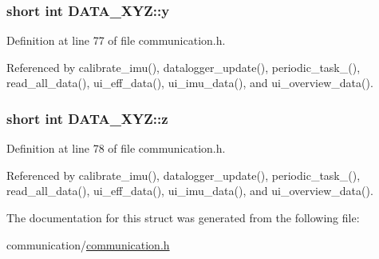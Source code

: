 \hypertarget{structDATA__XYZ_a94bbb1c889bf53eb6a5fffa2b39322cf}{
\subsubsection[{y}]{\setlength{\rightskip}{0pt plus 5cm}short int D\-A\-T\-A\-\_\-\-X\-Y\-Z\-::y}}\label{structDATA__XYZ_a94bbb1c889bf53eb6a5fffa2b39322cf}


Definition at line 77 of file communication.\-h.



Referenced by calibrate\-\_\-imu(), datalogger\-\_\-update(), periodic\-\_\-task\-\_(), read\-\_\-all\-\_\-data(), ui\-\_\-eff\-\_\-data(), ui\-\_\-imu\-\_\-data(), and ui\-\_\-overview\-\_\-data().

\hypertarget{structDATA__XYZ_a69e89ab0ec6e5d72fc5d54f62cc07fb5}{
\subsubsection[{z}]{\setlength{\rightskip}{0pt plus 5cm}short int D\-A\-T\-A\-\_\-\-X\-Y\-Z\-::z}}\label{structDATA__XYZ_a69e89ab0ec6e5d72fc5d54f62cc07fb5}


Definition at line 78 of file communication.\-h.



Referenced by calibrate\-\_\-imu(), datalogger\-\_\-update(), periodic\-\_\-task\-\_(), read\-\_\-all\-\_\-data(), ui\-\_\-eff\-\_\-data(), ui\-\_\-imu\-\_\-data(), and ui\-\_\-overview\-\_\-data().



The documentation for this struct was generated from the following file\-:\begin{DoxyCompactItemize}
\item 
communication/\hyperlink{communication_2communication_8h}{communication.\-h}\end{DoxyCompactItemize}
